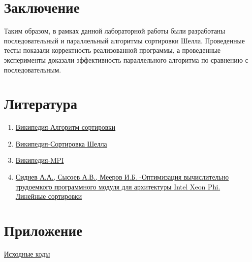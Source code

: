 \documentclass{report}
\begin{document}
\section*{Заключение}
Таким образом, в рамках данной лабораторной работы были разработаны последовательный и параллельный алгоритмы сортировки Шелла. Проведенные тесты показали корректность реализованной программы, а проведенные эксперименты доказали эффективность параллельного алгоритма по сравнению с последовательным.
\newpage

\section*{Литература}
\begin{enumerate}
\item \href {https://ru.wikipedia.org/wiki/%D0%90%D0%BB%D0%B3%D0%BE%D1%80%D0%B8%D1%82%D0%BC_%D1%81%D0%BE%D1%80%D1%82%D0%B8%D1%80%D0%BE%D0%B2%D0%BA%D0%B8}{Википедия-Алгоритм сортировки}
\item \href {https://ru.wikipedia.org/wiki/%D0%A1%D0%BE%D1%80%D1%82%D0%B8%D1%80%D0%BE%D0%B2%D0%BA%D0%B0_%D0%A8%D0%B5%D0%BB%D0%BB%D0%B0}{Википедия-Сортировка Шелла}
\item \href {https://ru.wikipedia.org/wiki/Message_Passing_Interface}{Википедия-MPI}
\item \href {http://hpc-education.unn.ru/files/courses/XeonPhi/Lab07.pdf}{Сиднев А.А., Сысоев А.В., Мееров И.Б. -Оптимизация вычислительно трудоемкого программного модуля для архитектуры Intel Xeon Phi. Линейные сортировки}
\end{enumerate} 
\newpage

\section*{Приложение}

\href {https://github.com/allnes/pp_2021_autumn/tree/master/modules/task_3/ustyuzhanin_n_sort_shell_batcher}{Исходные коды}
\end{document}
